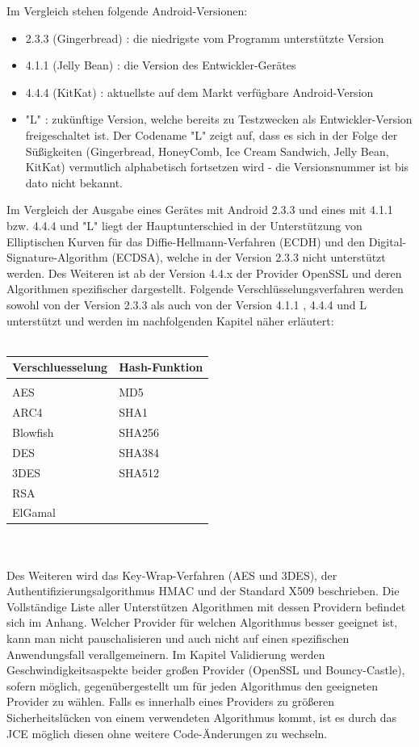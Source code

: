 \documentclass[10pt, a4paper,headsepline]{scrreprt}
\begin{document}
Im Vergleich stehen folgende Android-Versionen:
\begin{itemize}
\item 2.3.3 (Gingerbread) : die niedrigste vom Programm unterstützte Version
\item 4.1.1 (Jelly Bean) : die Version des Entwickler-Gerätes
\item 4.4.4 (KitKat) : aktuellste auf dem Markt verfügbare Android-Version
\item "L" : zukünftige Version, welche bereits zu Testzwecken als Entwickler-Version freigeschaltet ist. Der Codename "L" zeigt auf, dass es sich in der Folge der Süßigkeiten (Gingerbread, HoneyComb, Ice Cream Sandwich, Jelly Bean, KitKat) vermutlich alphabetisch fortsetzen wird - die Versionsnummer ist bis dato nicht bekannt.
\end{itemize}
Im Vergleich der Ausgabe eines Gerätes mit Android 2.3.3 und eines mit 4.1.1 bzw. 4.4.4 und "L" liegt der Hauptunterschied in der Unterstützung von Elliptischen Kurven für das Diffie-Hellmann-Verfahren (ECDH) und den Digital-Signature-Algorithm (ECDSA), welche in der Version 2.3.3 nicht unterstützt werden. Des Weiteren ist ab der Version 4.4.x der Provider OpenSSL und deren Algorithmen spezifischer dargestellt.
Folgende Verschlüsselungsverfahren werden sowohl von der Version 2.3.3 als auch von der Version 4.1.1 , 4.4.4 und L unterstützt und werden im nachfolgenden Kapitel näher erläutert: \\ \\
\begin{tabular}{|l|l|} \hline\hline
\textbf{Verschluesselung} & \textbf{Hash-Funktion} \\ \hline &  \\
AES & MD5 \\
ARC4 & SHA1 \\
Blowfish & SHA256 \\
DES & SHA384 \\
3DES & SHA512 \\
RSA & \\
ElGamal & \\
\hline\hline
\end{tabular} \\
\\Des Weiteren wird das Key-Wrap-Verfahren (AES und 3DES), der Authentifizierungsalgorithmus HMAC und der Standard X509 beschrieben. Die Vollständige Liste aller Unterstützen Algorithmen mit dessen Providern befindet sich im Anhang. Welcher Provider für welchen Algorithmus besser geeignet ist, kann man nicht pauschalisieren und auch nicht auf einen spezifischen Anwendungsfall verallgemeinern. Im Kapitel Validierung werden Geschwindigkeitsaspekte beider großen Provider (OpenSSL und Bouncy-Castle), sofern möglich, gegenübergestellt um für jeden Algorithmus den geeigneten Provider zu wählen. Falls es innerhalb eines Providers zu größeren Sicherheitslücken von einem verwendeten Algorithmus kommt, ist es durch das JCE möglich diesen ohne weitere Code-Änderungen zu wechseln. 
\end{document}
